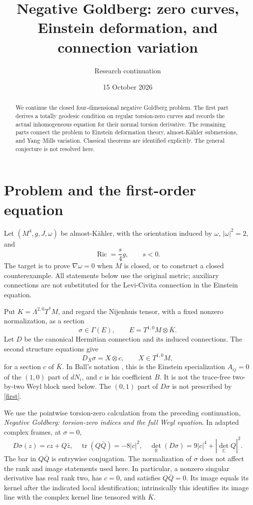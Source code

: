 \documentclass[11pt]{article}
\title{Negative Goldberg: zero curves, Einstein deformation, and connection variation}
\author{Research continuation}
\date{15 October 2026}
\newcommand{\Ric}{\operatorname{Ric}}
\newcommand{\tr}{\operatorname{tr}}
\begin{document}
\maketitle
\begin{abstract}
We continue the closed four-dimensional negative Goldberg problem. The first part derives a totally geodesic condition on regular torsion-zero curves and records the actual inhomogeneous equation for their normal torsion derivative. The remaining parts connect the problem to Einstein deformation theory, almost-K\"ahler submersions, and Yang--Mills variation. Classical theorems are identified explicitly. The general conjecture is not resolved here.
\end{abstract}

\section{Problem and the first-order equation}
Let $(M^4,g,J,\omega)$ be almost-K\"ahler, with the orientation induced by $\omega$, $|\omega|^2=2$, and
\[
\Ric=\frac{s}{4}g,\qquad s<0.
\]
The target is to prove $\nabla\omega=0$ when $M$ is closed, or to construct a closed counterexample. All statements below use the original metric; auxiliary connections are not substituted for the Levi-Civita connection in the Einstein equation.

Put $K=\Lambda^{2,0}T^*M$, and regard the Nijenhuis tensor, with a fixed nonzero normalization, as a section
\[
\sigma\in\Gamma(E),\qquad E=T^{1,0}M\otimes\bar K.
\]
Let $D$ be the canonical Hermitian connection and its induced connections. The second structure equations give
\begin{equation}\label{first}
D_X\sigma=X\otimes c,\qquad X\in T^{1,0}M,
\end{equation}
for a section $c$ of $\bar K$. In Ball's notation \cite[(2.4)]{Ball}, this is the Einstein specialization $A_{ij}=0$ of the $(1,0)$ part of $dN_i$, and $c$ is his coefficient $B$. It is not the trace-free two-by-two Weyl block used below. The $(0,1)$ part of $D\sigma$ is not prescribed by \eqref{first}.

We use the pointwise torsion-zero calculation from the preceding continuation, \emph{Negative Goldberg: torsion-zero indices and the full Weyl equation}. In adapted complex frames, at $\sigma=0$,
\begin{equation}\label{zeroalgebra}
D\sigma(z)=cz+Q\bar z,\quad
\tr(Q\bar Q)=-8|c|^2,\quad
\det_{\mathbb R}(D\sigma)=9|c|^4+|\det_{\mathbb C}Q|^2.
\end{equation}
The bar in $Q\bar Q$ is entrywise conjugation. The normalization of $\sigma$ does not affect the rank and image statements used here. In particular, a nonzero singular derivative has real rank two, has $c=0$, and satisfies $Q\bar Q=0$. Its image equals its kernel after the indicated local identification; intrinsically this identifies its image line with the complex kernel line tensored with $\bar K$.
\end{document}
